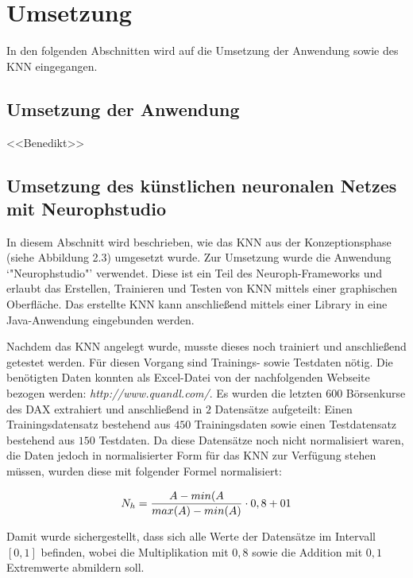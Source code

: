 \chapter{Umsetzung}
\label{chapter:Umsetzung}

In den folgenden Abschnitten wird auf die Umsetzung der Anwendung sowie des KNN eingegangen.

\section{Umsetzung der Anwendung}
\label{section:Umsetzung der Anwendung}
<<Benedikt>>\Blindtext

\section{Umsetzung des künstlichen neuronalen Netzes mit Neurophstudio} %
\label{section:Umsetzung des künstlichen neuronalen Netzes mit Neurophstudio} %

In diesem Abschnitt wird beschrieben, wie das KNN aus der Konzeptionsphase (siehe Abbildung 2.3) umgesetzt wurde. Zur Umsetzung wurde die Anwendung `"Neurophstudio"' verwendet. Diese ist ein Teil des Neuroph-Frameworks und erlaubt das Erstellen, Trainieren und Testen von KNN mittels einer graphischen Oberfläche. Das erstellte KNN kann anschließend mittels einer Library in eine Java-Anwendung eingebunden werden.

Nachdem das KNN angelegt wurde, musste dieses noch trainiert und anschließend getestet werden. Für diesen Vorgang sind Trainings- sowie Testdaten nötig. Die benötigten Daten konnten als Excel-Datei von der nachfolgenden Webseite bezogen werden: \textit{http://www.quandl.com/}. Es wurden die letzten $600$ Börsenkurse des DAX extrahiert und anschließend in $2$ Datensätze aufgeteilt: Einen Trainingsdatensatz bestehend aus $450$ Trainingsdaten sowie einen Testdatensatz bestehend aus $150$ Testdaten. Da diese Datensätze noch nicht normalisiert waren, die Daten jedoch in normalisierter Form für das KNN zur Verfügung stehen müssen, wurden diese mit folgender Formel normalisiert:

\begin{equation}\formelentry{Normalisierungsformel}
  N_h = \frac{A-min(A}{max(A)-min(A)}\cdot0,8+01
\end{equation}

Damit wurde sichergestellt, dass sich alle Werte der Datensätze im Intervall $[0,1]$ befinden, wobei die Multiplikation mit $0,8$ sowie die Addition mit $0,1$ Extremwerte abmildern soll.

